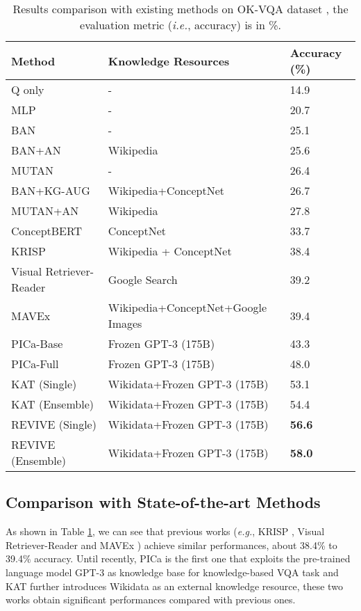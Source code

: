 \documentclass{article}
\begin{document}
\begin{table}
  \caption{Results comparison with existing methods on OK-VQA dataset \cite{marino2019ok}, the evaluation metric (\textit{i.e.}, accuracy) is in \%.}
  \label{sota}
  \centering
  \begin{tabular}{p{4.6cm}<{\centering} | p{6cm}<{\centering} | p{2cm}<{\centering}}
    \toprule
    Method & Knowledge Resources & Accuracy (\%) \\
    \midrule
    Q only \cite{marino2019ok} & - & 14.9 \\
    MLP \cite{marino2019ok} & - & 20.7 \\
    BAN \cite{marino2019ok} & - & 25.1 \\
    BAN+AN \cite{marino2019ok} & Wikipedia & 25.6 \\
    MUTAN \cite{marino2019ok} & - & 26.4 \\
    BAN+KG-AUG \cite{li2020boosting} & Wikipedia+ConceptNet & 26.7 \\
    MUTAN+AN \cite{marino2019ok} & Wikipedia & 27.8 \\
    ConceptBERT \cite{garderes2020conceptbert} & ConceptNet & 33.7 \\
    KRISP \cite{marino2021krisp} & Wikipedia + ConceptNet & 38.4 \\
    Visual Retriever-Reader \cite{luo2021weakly} & Google Search & 39.2 \\
    MAVEx \cite{wu2021multi} & Wikipedia+ConceptNet+Google Images & 39.4 \\
    PICa-Base \cite{yang2021empirical} & Frozen GPT-3 (175B) & 43.3 \\
    PICa-Full \cite{yang2021empirical} & Frozen GPT-3 (175B) & 48.0 \\
    KAT (Single) \cite{gui2021kat} & Wikidata+Frozen GPT-3 (175B) & 53.1 \\ 
    KAT (Ensemble) \cite{gui2021kat} & Wikidata+Frozen GPT-3 (175B) & 54.4 \\ 
    \midrule
    REVIVE (Single) & Wikidata+Frozen GPT-3 (175B) & \textbf{56.6} \\
    REVIVE (Ensemble) & Wikidata+Frozen GPT-3 (175B) & \textbf{58.0} \\
    \bottomrule
  \end{tabular}
  \vspace{-4.5mm}
\end{table}

\subsection{Comparison with State-of-the-art Methods}
\label{comparison}
As shown in Table \ref{sota}, we can see that previous works (\textit{e.g.}, KRISP \cite{marino2021krisp}, Visual Retriever-Reader \cite{luo2021weakly} and MAVEx \cite{wu2021multi}) achieve similar performances, about 38.4\% to 39.4\% accuracy. Until recently, PICa \cite{yang2021empirical} is the first one that exploits the pre-trained language model GPT-3 \cite{brown2020language} as knowledge base for knowledge-based VQA task and KAT \cite{gui2021kat} further introduces Wikidata \cite{vrandevcic2014wikidata} as an external knowledge resource, these two works obtain significant performances compared with previous ones.
\end{document}
